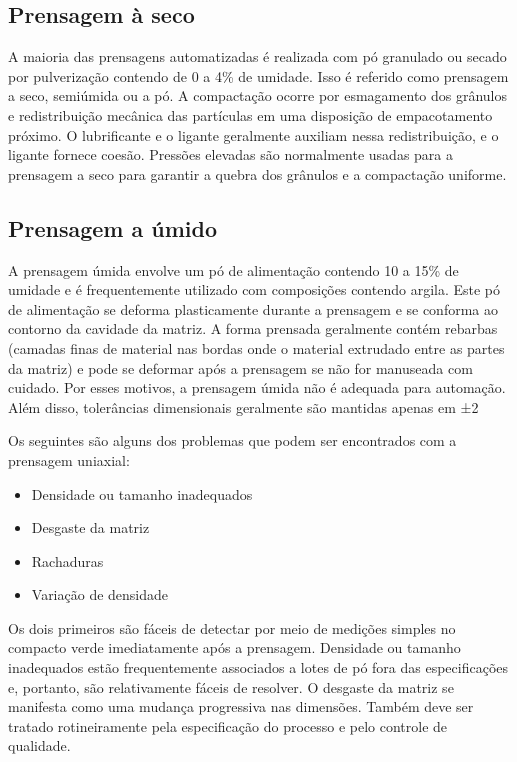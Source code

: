 \subsection*{Prensagem à seco}

A maioria das prensagens automatizadas é realizada com pó granulado ou secado por pulverização contendo de 0 a 4\% de umidade. Isso é referido como prensagem a seco, semiúmida ou a pó. A compactação ocorre por esmagamento dos grânulos e redistribuição mecânica das partículas em uma disposição de empacotamento próximo. O lubrificante e o ligante geralmente auxiliam nessa redistribuição, e o ligante fornece coesão. Pressões elevadas são normalmente usadas para a prensagem a seco para garantir a quebra dos grânulos e a compactação uniforme.

\subsection*{Prensagem a úmido}

A prensagem úmida envolve um pó de alimentação contendo 10 a 15\% de umidade e é frequentemente utilizado com composições contendo argila. Este pó de alimentação se deforma plasticamente durante a prensagem e se conforma ao contorno da cavidade da matriz. A forma prensada geralmente contém rebarbas (camadas finas de material nas bordas onde o material extrudado entre as partes da matriz) e pode se deformar após a prensagem se não for manuseada com cuidado. Por esses motivos, a prensagem úmida não é adequada para automação. Além disso, tolerâncias dimensionais geralmente são mantidas apenas em ±2%

Os seguintes são alguns dos problemas que podem ser encontrados com a prensagem uniaxial:

\begin{itemize}
    \item Densidade ou tamanho inadequados
    \item Desgaste da matriz
    \item Rachaduras
    \item Variação de densidade
\end{itemize}

Os dois primeiros são fáceis de detectar por meio de medições simples no compacto verde imediatamente após a prensagem. Densidade ou tamanho inadequados estão frequentemente associados a lotes de pó fora das especificações e, portanto, são relativamente fáceis de resolver. O desgaste da matriz se manifesta como uma mudança progressiva nas dimensões. Também deve ser tratado rotineiramente pela especificação do processo e pelo controle de qualidade.

